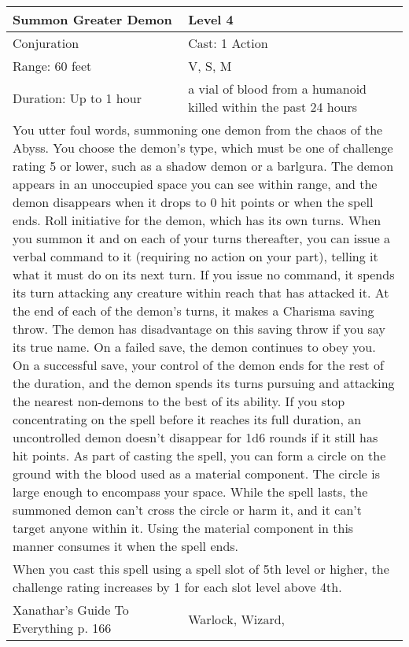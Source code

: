 \documentclass[11pt]{report}
\begin{document}
\begin{table}[H]
	\begin{tabular}{||p{6cm}|p{6cm}||}
		\hline\hline
		\bf{Summon Greater Demon} & Level 4\\ \hline
		Conjuration & Cast: 1 Action\\ \hline
		Range: 60 feet & V, S, M\\ \hline
		Duration: Up to 1 hour & a vial of blood from a humanoid killed within the past 24 hours\\ \hline
		\multicolumn{2}{||p{12cm}||}{You utter foul words, summoning one demon from the chaos of the Abyss. You choose the demon’s type, which must be one of challenge rating 5 or lower, such as a shadow demon or a barlgura. The demon appears in an unoccupied space you can see within range, and the demon disappears when it drops to 0 hit points or when the spell ends.
Roll initiative for the demon, which has its own turns. When you summon it and on each of your turns thereafter, you can issue a verbal command to it (requiring no action on your part), telling it what it must do on its next turn. If you issue no command, it spends its turn attacking any creature within reach that has attacked it.
At the end of each of the demon’s turns, it makes a Charisma saving throw. The demon has disadvantage on this saving throw if you say its true name. On a failed save, the demon continues to obey you. On a successful save, your control of the demon ends for the rest of the duration, and the demon spends its turns pursuing and attacking the nearest non-demons to the best of its ability. If you stop concentrating on the spell before it reaches its full duration, an uncontrolled demon doesn’t disappear for 1d6 rounds if it still has hit points.
As part of casting the spell, you can form a circle on the ground with the blood used as a material component. The circle is large enough to encompass your space. While the spell lasts, the summoned demon can’t cross the circle or harm it, and it can’t target anyone within it. Using the material component in this manner consumes it when the spell ends.}\\ \hline
		\multicolumn{2}{||p{12cm}||}{When you cast this spell using a spell slot of 5th level or higher, the challenge rating increases by 1 for each slot level above 4th.}\\ \hline
Xanathar's Guide To Everything p. 166 & Warlock, Wizard, \\ \hline\hline
	\end{tabular}
\end{table}
\end{document}
